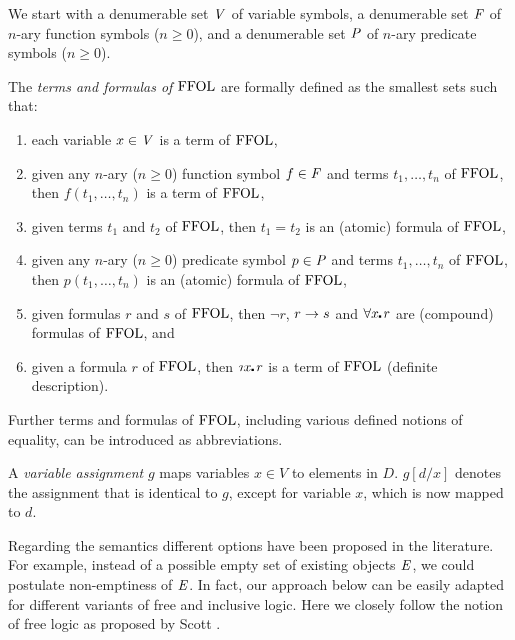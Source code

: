 \begin{defn}
  We start with a denumerable set $\V$ of variable symbols, a denumerable set
  $\F$ of $n$-ary function symbols ($n\geq 0$), and a denumerable set
  $\P$ of $n$-ary predicate symbols ($n\geq 0$).

  The \emph{terms and formulas of $\FFOL$} are formally defined as the
  smallest sets such that:
\begin{enumerate}
\item each variable $x\in\V$ is a term of $\FFOL$, 
\item given any $n$-ary ($n\geq 0$) function symbol $f\in\F$ and terms
  $t_1,\ldots,t_n$ of $\FFOL$, then $f(t_1,\ldots,t_n)$ is a term of $\FFOL$, 
\item given terms $t_1$ and $t_2$ of $\FFOL$, then $t_1 = t_2$ is an
  (atomic) formula of $\FFOL$,
\item given any $n$-ary ($n\geq 0$) predicate symbol $p\in\P$ and terms
$t_1,\ldots,t_n$ of $\FFOL$, then $p(t_1,\ldots,t_n)$ is an (atomic)
formula of $\FFOL$, 
\item given formulas $r$ and $s$ of $\FFOL$, then $\neg r$, $r
  \Impl s$ and $\forall x\lambdot r$ are (compound) formulas of
  $\FFOL$, and
\item given a formula $r$ of $\FFOL$, then $\Descr x\lambdot r$ is a
  term of $\FFOL$ (definite  description).
\end{enumerate}
\end{defn}

Further terms and formulas of $\FFOL$, including various defined notions of
equality, can be introduced as abbreviations. 


A \emph{variable assignment} $g$ maps
variables $x\in V$ to elements in $D$. $g[d/x]$ denotes the
assignment that is identical to $g$, except for variable $x$, which is
now mapped to $d$.

Regarding the semantics different options have been proposed in the literature. For
example, instead of a possible empty set of existing objects $\ex$, we
could postulate non-emptiness of $\ex$. 
In fact, our approach below can be easily adapted for different variants of free and
inclusive logic.
Here we closely
follow the notion of free logic as proposed by Scott \cite{Scott67}.



